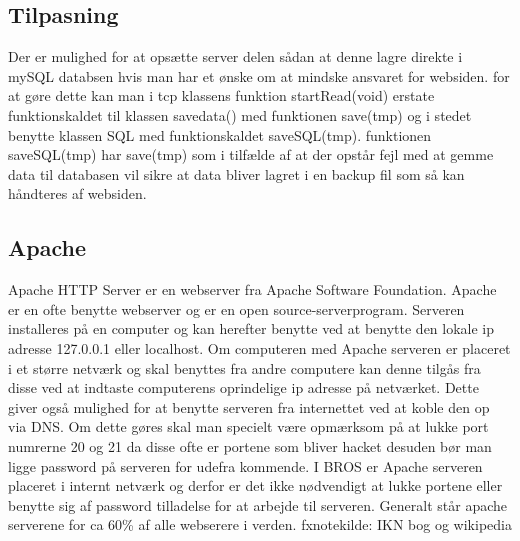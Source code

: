 \subsection{Tilpasning}
Der er mulighed for at opsætte server delen sådan at denne lagre direkte i mySQL databsen hvis man har et ønske om at mindske ansvaret for websiden. for at gøre dette kan man i tcp klassens funktion startRead(void) erstate funktionskaldet til klassen savedata() med funktionen save(tmp) og i stedet benytte klassen SQL med funktionskaldet saveSQL(tmp). funktionen saveSQL(tmp) har save(tmp) som i tilfælde af at der opstår fejl med at gemme data til databasen vil sikre at data bliver lagret i en backup fil som så kan håndteres af websiden.

\subsection{Apache}
Apache HTTP Server er en webserver fra Apache Software Foundation. Apache er en ofte benytte webserver og er en open source-serverprogram. Serveren installeres på en computer og kan herefter benytte ved at benytte den lokale ip adresse 127.0.0.1 eller localhost. Om computeren med Apache serveren er placeret i et større netværk og skal benyttes fra andre computere kan denne tilgås fra disse ved at indtaste computerens oprindelige ip adresse på netværket. Dette giver også mulighed for at benytte serveren fra internettet ved at koble den op via DNS. Om dette gøres skal man specielt være opmærksom på at lukke port numrerne 20 og 21 da disse ofte er portene som bliver hacket desuden bør man ligge password på serveren for udefra kommende. I BROS er Apache serveren placeret i internt netværk og derfor er det ikke nødvendigt at lukke portene eller benytte sig af password tilladelse for at arbejde til serveren.
Generalt står apache serverene for ca 60\% af alle webserere i verden.
fxnote{kilde: IKN bog og wikipedia} 

